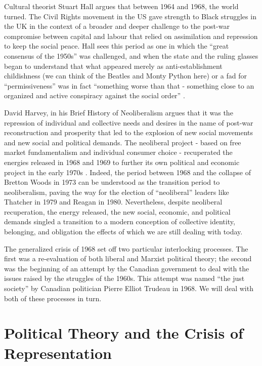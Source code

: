 \documentclass[12pt,oneside]{memoir}
\begin{document}
Cultural theorist Stuart Hall argues that between 1964 and 1968, the world turned. The Civil Rights movement in the US gave strength to Black struggles in the UK in the context of a broader and deeper challenge to the post-war compromise between capital and labour that relied on assimilation and repression to keep the social peace. Hall sees this period as one in which the ``great consensus of the 1950s'' was challenged, and when the state and the ruling glasses began to understand that what appeared merely as anti-establishment childishness (we can think of the Beatles and Monty Python here) or a fad for ``permissiveness'' was in fact ``something worse than that - something close to an organized and active conspiracy against the social order'' \citep[149-150]{Hall1978}.

David Harvey, in his Brief History of Neoliberalism argues that it was the repression of individual and collective needs and desires in the name of post-war reconstruction and prosperity that led to the explosion of new social movements and new social and political demands. The neoliberal project - based on free market fundamentalism and individual consumer choice - recuperated the energies released in 1968 and 1969 to further its own political and economic project in the early 1970s \citep[10]{Harvey2005}. Indeed, the period between 1968 and the collapse of Bretton Woods in 1973 can be understood as the transition period to neoliberalism, paving the way for the election of ``neoliberal'' leaders like Thatcher in 1979 and Reagan in 1980. Nevertheless, despite neoliberal recuperation, the energy released, the new social, economic, and political demands singled a transition to a modern conception of collective identity, belonging, and obligation the effects of which we are still dealing with today.

The generalized crisis of 1968 set off two particular interlocking processes. The first was a re-evaluation of both liberal and Marxist political theory; the second was the beginning of an attempt by the Canadian government to deal with the issues raised by the struggles of the 1960s. This attempt was named ``the just society'' by Canadian politician Pierre Elliot Trudeau in 1968. We will deal with both of these processes in turn.

\section*{Political Theory and the Crisis of Representation}
\end{document}
